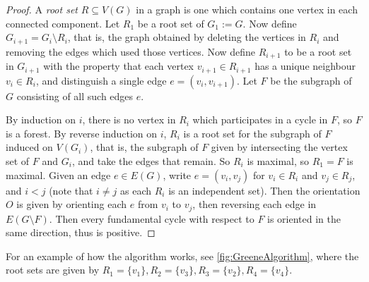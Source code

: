 \documentclass[12pt]{report}
\theoremstyle{definition}
\theoremstyle{upright}
\begin{document}
\begin{proof}

    A \textit{root set} $R\subseteq V(G)$ in a graph is one which contains one vertex in each connected component.
    Let $R_1$ be a root set of $G_1:=G$.
    Now define $G_{i+1}=G_i\setminus R_i$, that is, the graph obtained by deleting the vertices in $R_i$ and removing the edges which used those vertices.
    Now define $R_{i+1}$ to be a root set in $G_{i+1}$ with the property that each vertex $v_{i+1}\in R_{i+1}$ has a unique neighbour $v_i\in R_i$, and distinguish a single edge $e=(v_i, v_{i+1})$.
    Let $F$ be the subgraph of $G$ consisting of all such edges $e$.

    By induction on $i$, there is no vertex in $R_i$ which participates in a cycle in $F$, so $F$ is a forest.
    By reverse induction on $i$, $R_i$ is a root set for the subgraph of $F$ induced on $V(G_i)$, that is, the subgraph of $F$ given by intersecting the vertex set of $F$ and $G_i$, and take the edges that remain.
    So $R_i$ is maximal, so $R_1=F$ is maximal.
    Given an edge $e\in E(G)$, write $e=(v_i, v_j)$ for $v_i\in R_i$ and $v_j\in R_j$, and $i<j$ (note that $i\neq j$ as each $R_i$ is an independent set).
    Then the orientation $O$ is given by orienting each $e$ from $v_i$ to $v_j$, then reversing each edge in $E(G\setminus F)$.
    Then every fundamental cycle with respect to $F$ is oriented in the same direction, thus is positive.
    
\end{proof}

For an example of how the algorithm works, see \cref{fig:GreeneAlgorithm}, where the root sets are given by $R_1=\{v_1\}, R_2=\{v_3\}, R_3=\{v_2\}, R_4=\{v_4\}$.
\end{document}
